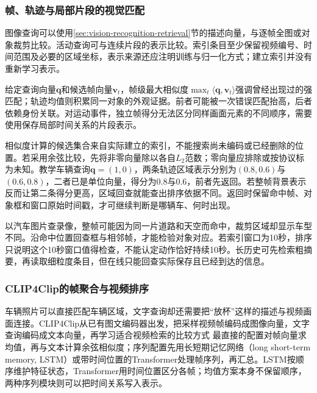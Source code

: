 \subsubsection{帧、轨迹与局部片段的视觉匹配}
\label{sec:vision-video-visual-matching}

图像查询可以使用\ref{sec:vision-recognition-retrieval}节的描述向量，与逐帧全图或对象裁剪比较。活动查询可与连续片段的表示比较。索引条目至少保留视频编号、时间范围及必要的区域坐标，表示来源还应注明训练与归一化方式；建立索引并没有重新学习表示。

给定查询向量$\bm{q}$和候选帧向量$\bm{v}_t$，帧级最大相似度$\max_t\langle\bm{q},\bm{v}_t\rangle$强调曾经出现过的强匹配；轨迹均值则积累同一对象的外观证据。前者可能被一次错误匹配抬高，后者依赖身份关联。对运动事件，独立帧得分无法区分同样画面元素的不同顺序，需要使用保存局部时间关系的片段表示。

相似度计算的候选集合来自实际建立的索引，不能搜索尚未编码或已经删除的位置。若采用余弦比较，先将非零向量除以各自$L_2$范数；零向量应排除或按协议标为未知。教学车辆查询$\bm{q}=(1,0)$，两条轨迹区域表示分别为$(0.8,0.6)$与$(0.6,0.8)$，二者已是单位向量，得分为0.8与0.6，前者先返回。若整帧背景表示反而让第二条得分更高，区域回查就能查出排序依据不同。返回时保留命中帧、对象框和窗口原始时间戳，才可继续判断是哪辆车、何时出现。

以汽车图片查录像，整帧可能因为同一片道路和天空而命中，裁剪区域却显示车型不同。沿命中位置回查框与相邻帧，才能检验对象对应。若索引窗口为10秒，排序只说明这个10秒窗口值得检查，不能认定动作恰好持续10秒。长历史可先检索粗摘要，再读取细粒度条目，但在线只能回查实际保存且已经到达的信息。

\subsubsection{CLIP4Clip的帧聚合与视频排序}
\label{sec:vision-video-clip4clip}

车辆照片可以直接匹配车辆区域，文字查询却还需要把“放杯”这样的描述与视频画面连接。CLIP4Clip从已有图文编码器出发，把采样视频帧编码成图像向量，文字查询编码成文本向量，再学习适合视频检索的比较方式 最直接的配置对帧向量求均值，再与文本计算余弦相似度；序列配置先用长短期记忆网络（long short-term memory, LSTM）或带时间位置的Transformer处理帧序列，再汇总。LSTM按顺序维护特征状态，Transformer用时间位置区分各帧；均值方案本身不保留顺序，两种序列模块则可以把时间关系写入表示。

